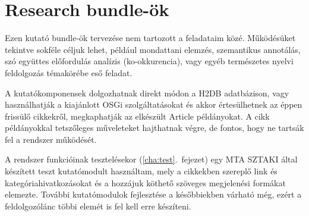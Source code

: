 
\section{Research bundle-ök}

Ezen kutató bundle-ök tervezése nem tartozott a feladataim közé. Működésüket tekintve sokféle céljuk lehet, például mondattani elemzés, szemantikus annotálás, szó együttes előfordulás analízis (ko-okkurencia), vagy egyéb természetes nyelvi feldolgozás témakörébe eső feladat.

A kutatókomponensek dolgozhatnak direkt módon a H2DB adatbázison, vagy használhatják a kiajánlott OSGi szolgáltatásokat és akkor értesülhetnek az éppen frissülő cikkekről, megkaphatják az elkészült Article példányokat. A cikk példányokkal tetszőleges műveleteket hajthatnak végre, de fontos, hogy ne tartsák fel a rendszer működését.

A rendszer funkcióinak tesztelésekor (\ref{cha:test}.~fejezet) egy MTA SZTAKI által készített teszt kutatómodult használtam, mely a cikkekben szereplő link és kategóriahivatkozásokat és a hozzájuk köthető szöveges megjelenési formákat elemezte. További kutatómodulok fejlesztése a későbbiekben várható még, ezért a feldolgozólánc többi elemét is fel kell erre készíteni.

\label{sec:researchbundle}


